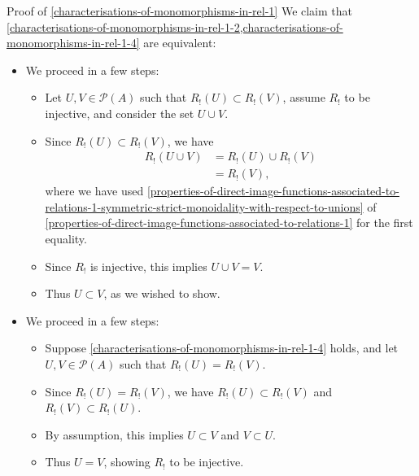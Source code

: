 \begin{Proof}{Proof of \cref{characterisations-of-monomorphisms-in-rel-1}}
    We claim that \cref{characterisations-of-monomorphisms-in-rel-1-2,characterisations-of-monomorphisms-in-rel-1-4} are equivalent:
    \begin{itemize}
        \item{}We proceed in a few steps:
            \begin{itemize}
                \item Let $U,V\in\mathcal{P}(A)$ such that $R_{!}(U)\subset R_{!}(V)$, assume $R_{!}$ to be injective, and consider the set $U\cup V$.
                \item Since $R_{!}(U)\subset R_{!}(V)$, we have
                    \begin{align*}
                        R_{!}(U\cup V) &= R_{!}(U)\cup R_{!}(V)\\
                                       &= R_{!}(V),
                    \end{align*}
                    where we have used \cref{properties-of-direct-image-functions-associated-to-relations-1-symmetric-strict-monoidality-with-respect-to-unions} of \cref{properties-of-direct-image-functions-associated-to-relations-1} for the first equality.
                \item Since $R_{!}$ is injective, this implies $U\cup V=V$.
                \item Thus $U\subset V$, as we wished to show.
            \end{itemize}
        \item{}We proceed in a few steps:
            \begin{itemize}
                \item Suppose \cref{characterisations-of-monomorphisms-in-rel-1-4} holds, and let $U,V\in\mathcal{P}(A)$ such that $R_{!}(U)=R_{!}(V)$.
                \item Since $R_{!}(U)=R_{!}(V)$, we have $R_{!}(U)\subset R_{!}(V)$ and $R_{!}(V)\subset R_{!}(U)$.
                \item By assumption, this implies $U\subset V$ and $V\subset U$.
                \item Thus $U=V$, showing $R_{!}$ to be injective.
            \end{itemize}
    \end{itemize}


\end{Proof}
